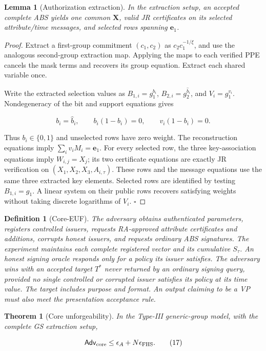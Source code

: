 \documentclass[11pt]{article}
\newtheorem{definition}{Definition}
\newtheorem{theorem}{Theorem}
\newtheorem{lemma}{Lemma}
\begin{document}
\begin{lemma}[Authorization extraction]
In the extraction setup, an accepted complete ABS yields one common \(\boldsymbol X\), valid JR certificates on its selected attribute/time messages, and selected rows spanning \(\boldsymbol e_1\).

\end{lemma}
\begin{proof}
Extract a first-group commitment \((c_1,c_2)\) as \(c_2c_1^{-1/\xi}\), and use the analogous second-group extraction map. Applying the maps to each verified PPE cancels the mask terms and recovers its group equation. Extract each shared variable once.

Write the extracted selection values as \(B_{1,i}=g_1^{b_i}\), \(B_{2,i}=g_2^{\widehat b_i}\), and \(V_i=g_1^{v_i}\). Nondegeneracy of the bit and support equations gives

\[
b_i=\widehat b_i,\qquad b_i(1-b_i)=0,\qquad
v_i(1-b_i)=0.
\tag{16}
\]

Thus \(b_i\in\{0,1\}\) and unselected rows have zero weight. The reconstruction equations imply \(\sum_i v_iM_i=\boldsymbol e_1\). For every selected row, the three key-association equations imply \(W_{i,j}=X_j\); its two certificate equations are exactly JR verification on \((X_1,X_2,X_3,A_{i,\tau})\). These rows and the message equations use the same three extracted key elements. Selected rows are identified by testing \(B_{1,i}=g_1\). A linear system on their public rows recovers satisfying weights without taking discrete logarithms of \(V_i\). \(\square\)

\end{proof}
\begin{definition}[Core-EUF]
The adversary obtains authenticated parameters, registers controlled issuers, requests RA-approved attribute certificates and additions, corrupts honest issuers, and requests ordinary ABS signatures. The experiment maintains each complete registered vector and its cumulative \(S_\tau\). An honest signing oracle responds only for a policy its issuer satisfies. The adversary wins with an accepted target \(T^*\) never returned by an ordinary signing query, provided no single controlled or corrupted issuer satisfies its policy at its time value. The target includes purpose and format. An output claiming to be a VP must also meet the presentation acceptance rule.

\end{definition}
\begin{theorem}[Core unforgeability]
In the Type-III generic-group model, with the complete GS extraction setup,

\[
\mathsf{Adv}_{\rm core}\le \epsilon_A+N\epsilon_{\rm FHS}.
\tag{17}
\]

\end{theorem}
\end{document}
